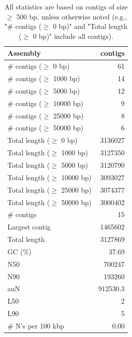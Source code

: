 \documentclass[12pt,a4paper]{article}
\begin{document}
\begin{table}[ht]
\begin{center}
\caption{All statistics are based on contigs of size $\geq$ 500 bp, unless otherwise noted (e.g., "\# contigs ($\geq$ 0 bp)" and "Total length ($\geq$ 0 bp)" include all contigs).}
\begin{tabular}{|l*{1}{|r}|}
\hline
Assembly & contigs \\ \hline
\# contigs ($\geq$ 0 bp) & 61 \\ \hline
\# contigs ($\geq$ 1000 bp) & 14 \\ \hline
\# contigs ($\geq$ 5000 bp) & 12 \\ \hline
\# contigs ($\geq$ 10000 bp) & 9 \\ \hline
\# contigs ($\geq$ 25000 bp) & 8 \\ \hline
\# contigs ($\geq$ 50000 bp) & 6 \\ \hline
Total length ($\geq$ 0 bp) & 3136027 \\ \hline
Total length ($\geq$ 1000 bp) & 3127350 \\ \hline
Total length ($\geq$ 5000 bp) & 3120790 \\ \hline
Total length ($\geq$ 10000 bp) & 3093027 \\ \hline
Total length ($\geq$ 25000 bp) & 3074377 \\ \hline
Total length ($\geq$ 50000 bp) & 3000402 \\ \hline
\# contigs & 15 \\ \hline
Largest contig & 1465602 \\ \hline
Total length & 3127869 \\ \hline
GC (\%) & 37.69 \\ \hline
N50 & 700247 \\ \hline
N90 & 193260 \\ \hline
auN & 912530.3 \\ \hline
L50 & 2 \\ \hline
L90 & 5 \\ \hline
\# N's per 100 kbp & 0.00 \\ \hline
\end{tabular}
\end{center}
\end{table}
\end{document}
